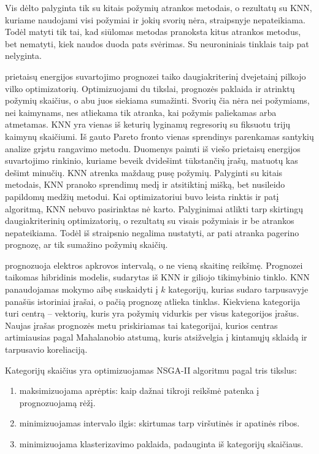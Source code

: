 \documentclass[]{VUMIFTemplateClass}
\begin{document}
    Vis dėlto palyginta tik su kitais požymių atrankos metodais, o rezultatų su KNN, kuriame naudojami visi požymiai ir jokių svorių nėra, straipsnyje nepateikiama.
    Todėl matyti tik tai, kad siūlomas metodas pranoksta kitus atrankos metodus, bet nematyti, kiek naudos duoda pats svėrimas.
    Su neuroniniais tinklais taip pat nelyginta.

    \cite{moldovan2021} prietaisų energijos suvartojimo prognozei taiko daugiakriterinį dvejetainį pilkojo vilko optimizatorių.
    Optimizuojami du tikslai, prognozės paklaida ir atrinktų požymių skaičius, o abu juos siekiama sumažinti.
    Svorių čia nėra nei požymiams, nei kaimynams, nes atliekama tik atranka, kai požymis paliekamas arba atmetamas.
    KNN yra vienas iš keturių lyginamų regresorių su fiksuotu trijų kaimynų skaičiumi.
    Iš gauto Pareto fronto vienas sprendinys parenkamas santykių analize grįstu rangavimo metodu.
    Duomenys paimti iš viešo prietaisų energijos suvartojimo rinkinio, kuriame beveik dvidešimt tūkstančių įrašų, matuotų kas dešimt minučių.
    KNN atrenka maždaug pusę požymių.
    Palyginti su kitais metodais, KNN pranoko sprendimų medį ir atsitiktinį mišką, bet nusileido papildomų medžių metodui.
    Kai optimizatoriui buvo leista rinktis ir patį algoritmą, KNN nebuvo pasirinktas nė karto.
    Palyginimai atlikti tarp skirtingų daugiakriterinių optimizatorių, o rezultatų su visais požymiais ir be atrankos nepateikiama.
    Todėl iš straipsnio negalima nustatyti, ar pati atranka pagerino prognozę, ar tik sumažino požymių skaičių.

    \cite{dong2021} prognozuoja elektros apkrovos intervalą, o ne vieną skaitinę reikšmę.
    Prognozei taikomas hibridinis modelis, sudarytas iš KNN ir giliojo tikimybinio tinklo.
    KNN panaudojamas mokymo aibę suskaidyti į $k$ kategorijų, kurias sudaro tarpusavyje panašūs istoriniai įrašai, o pačią prognozę atlieka tinklas.
    Kiekviena kategorija turi centrą -- vektorių, kuris yra požymių vidurkis per visus kategorijos įrašus.
    Naujas įrašas prognozės metu priskiriamas tai kategorijai, kurios centras artimiausias pagal Mahalanobio atstumą, kuris atsižvelgia į kintamųjų sklaidą ir tarpusavio koreliaciją.

    Kategorijų skaičius yra optimizuojamas NSGA-II algoritmu pagal tris tikslus:
    \begin{enumerate}
        \item maksimizuojama aprėptis: kaip dažnai tikroji reikšmė patenka į prognozuojamą rėžį.
        \item minimizuojamas intervalo ilgis: skirtumas tarp viršutinės ir apatinės ribos.
        \item minimizuojama klasterizavimo paklaida, padauginta iš kategorijų skaičiaus.
    \end{enumerate}
\end{document}
